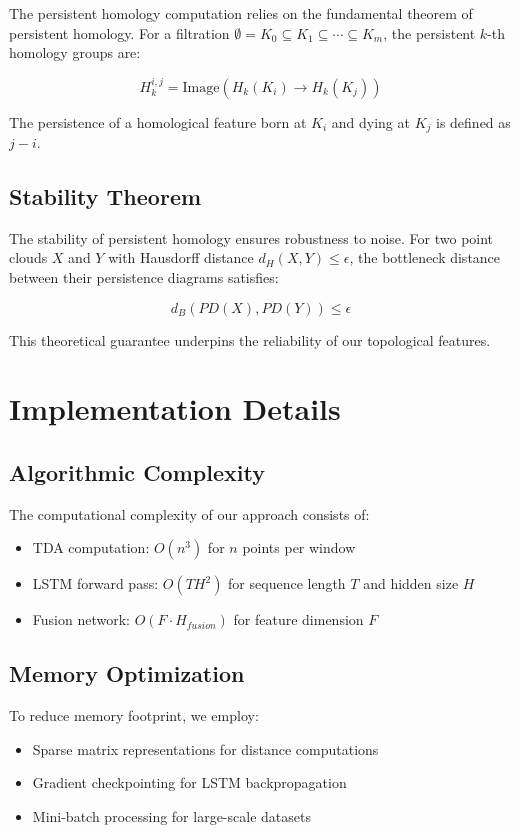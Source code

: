 \documentclass[conference]{IEEEtran}
\begin{document}
The persistent homology computation relies on the fundamental theorem of persistent homology. For a filtration $\emptyset = K_0 \subseteq K_1 \subseteq \cdots \subseteq K_m$, the persistent $k$-th homology groups are:

\begin{equation}
H_k^{i,j} = \text{Image}(H_k(K_i) \rightarrow H_k(K_j))
\end{equation}

The persistence of a homological feature born at $K_i$ and dying at $K_j$ is defined as $j - i$.

\subsection{Stability Theorem}

The stability of persistent homology ensures robustness to noise. For two point clouds $X$ and $Y$ with Hausdorff distance $d_H(X,Y) \leq \epsilon$, the bottleneck distance between their persistence diagrams satisfies:

\begin{equation}
d_B(PD(X), PD(Y)) \leq \epsilon
\end{equation}

This theoretical guarantee underpins the reliability of our topological features.

\section{Implementation Details}

\subsection{Algorithmic Complexity}

The computational complexity of our approach consists of:

\begin{itemize}
\item TDA computation: $O(n^3)$ for $n$ points per window
\item LSTM forward pass: $O(TH^2)$ for sequence length $T$ and hidden size $H$
\item Fusion network: $O(F \cdot H_{fusion})$ for feature dimension $F$
\end{itemize}

\subsection{Memory Optimization}

To reduce memory footprint, we employ:

\begin{itemize}
\item Sparse matrix representations for distance computations
\item Gradient checkpointing for LSTM backpropagation
\item Mini-batch processing for large-scale datasets
\end{itemize}
\end{document}
